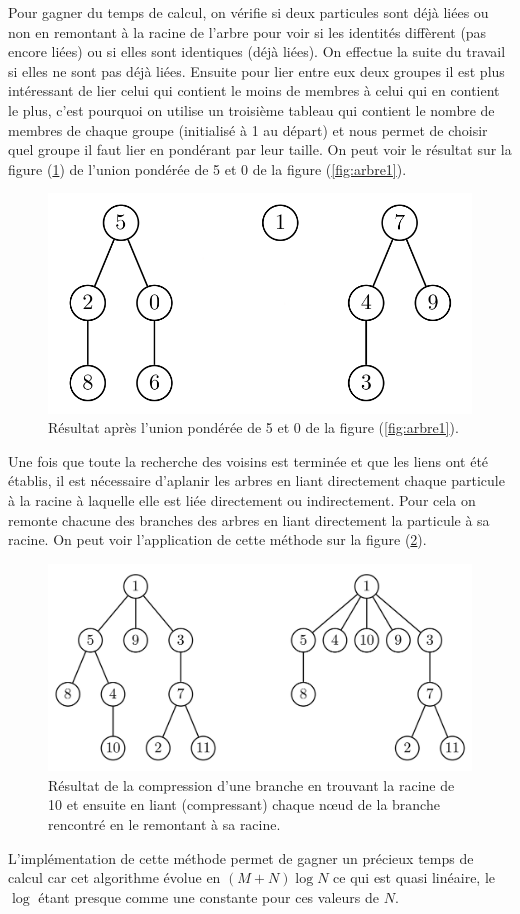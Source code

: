Pour gagner du temps de calcul, on vérifie si deux particules sont déjà liées ou non en remontant à la racine de l'arbre pour voir
si les identités diffèrent (pas encore liées) ou si elles sont identiques (déjà liées). On effectue la suite du travail si elles ne
sont pas déjà liées. Ensuite pour lier entre eux deux groupes il est plus intéressant de lier celui qui contient le moins de
membres à celui qui en contient le plus, c'est pourquoi on utilise un troisième tableau qui contient le nombre de membres de chaque
groupe (initialisé à 1 au départ) et nous permet de choisir quel groupe il faut lier en pondérant par leur taille. On peut voir le
résultat sur la figure (\ref{fig:arbre2}) de l'union pondérée de 5 et 0 de la figure (\ref{fig:arbre1}).
\begin{figure}[htb]
	\centering
	\includegraphics[width=0.5\linewidth]{arbre2.png}
	\caption{\footnotesize{}Résultat après l'union pondérée de 5 et 0 de la figure (\ref{fig:arbre1}).}
	\label{fig:arbre2}
\end{figure}
Une fois que toute la recherche des voisins est terminée et que les liens ont été établis, il est nécessaire d'aplanir les arbres
en liant directement chaque particule à la racine à laquelle elle est liée directement ou indirectement. Pour cela on remonte
chacune des branches des arbres en liant directement la particule à sa racine. On peut voir l'application de cette méthode sur la
figure (\ref{fig:arbre3}).
\begin{figure}[htb]
	\centering
	\includegraphics[width=0.5\linewidth]{arbre3.png}
	\caption{\footnotesize{}Résultat de la compression d'une branche en trouvant la racine de 10 et ensuite
	en liant (compressant) chaque n{\oe}ud de la branche rencontré en le remontant à sa racine.}
	\label{fig:arbre3}
\end{figure}
L'implémentation de cette méthode permet de gagner un précieux temps de calcul car cet algorithme évolue en $(M+N)\log{N}$ ce qui
est quasi linéaire, le $\log$ étant presque comme une constante pour ces valeurs de $N$.

